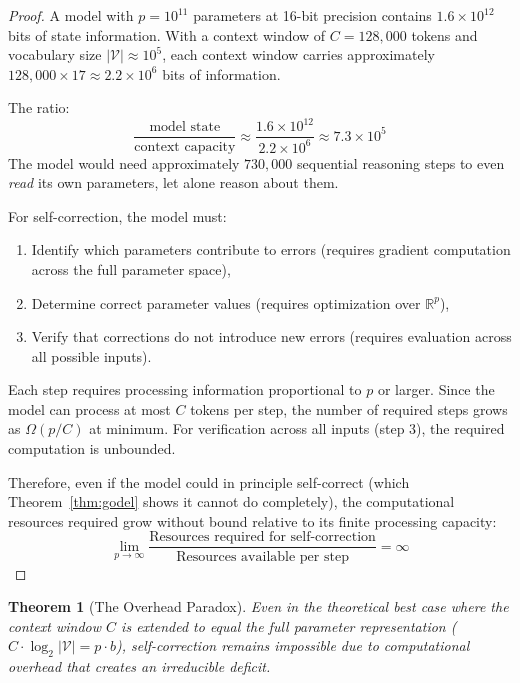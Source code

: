 \documentclass[11pt,a4paper]{article}
\newtheorem{theorem}{Theorem}[section]
\begin{document}
\begin{proof}
A model with $p = 10^{11}$ parameters at 16-bit precision contains $1.6 \times 10^{12}$ bits of state information. With a context window of $C = 128{,}000$ tokens and vocabulary size $|\mathcal{V}| \approx 10^5$, each context window carries approximately $128{,}000 \times 17 \approx 2.2 \times 10^6$ bits of information.

The ratio:
\begin{equation}
\frac{\text{model state}}{\text{context capacity}} \approx \frac{1.6 \times 10^{12}}{2.2 \times 10^{6}} \approx 7.3 \times 10^5
\end{equation}
The model would need approximately $730{,}000$ sequential reasoning steps to even \emph{read} its own parameters, let alone reason about them.

For self-correction, the model must:
\begin{enumerate}
    \item Identify which parameters contribute to errors (requires gradient computation across the full parameter space),
    \item Determine correct parameter values (requires optimization over $\mathbb{R}^p$),
    \item Verify that corrections do not introduce new errors (requires evaluation across all possible inputs).
\end{enumerate}
Each step requires processing information proportional to $p$ or larger. Since the model can process at most $C$ tokens per step, the number of required steps grows as $\Omega(p / C)$ at minimum. For verification across all inputs (step 3), the required computation is unbounded.

Therefore, even if the model could in principle self-correct (which Theorem~\ref{thm:godel} shows it cannot do completely), the computational resources required grow without bound relative to its finite processing capacity:
\begin{equation}
\lim_{p \to \infty} \frac{\text{Resources required for self-correction}}{\text{Resources available per step}} = \infty
\end{equation}
\end{proof}

\begin{theorem}[The Overhead Paradox]
\label{thm:overhead}
Even in the theoretical best case where the context window $C$ is extended to equal the full parameter representation ($C \cdot \log_2 |\mathcal{V}| = p \cdot b$), self-correction remains impossible due to computational overhead that creates an irreducible deficit.
\end{theorem}
\end{document}
